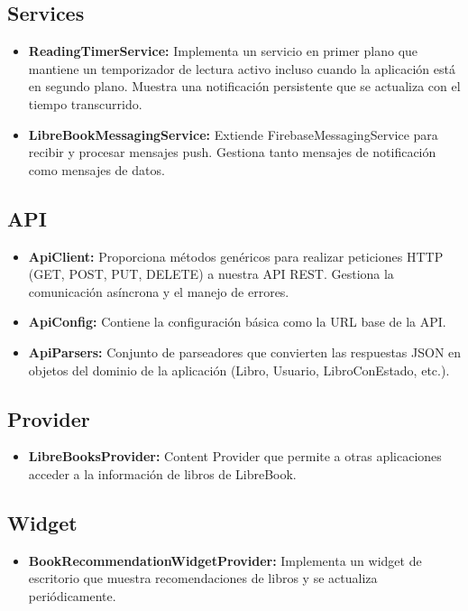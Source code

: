 \documentclass[a4paper,11pt]{report}
\begin{document}
      \subsection{Services}
        \begin{itemize}
          \item \textbf{ReadingTimerService:} Implementa un servicio en primer plano que mantiene un temporizador de lectura activo incluso cuando la aplicación está en segundo plano. Muestra una notificación persistente que se actualiza con el tiempo transcurrido.
          \item \textbf{LibreBookMessagingService:} Extiende FirebaseMessagingService para recibir y procesar mensajes push. Gestiona tanto mensajes de notificación como mensajes de datos.
        \end{itemize}
      \subsection{API}
        \begin{itemize}
          \item \textbf{ApiClient:} Proporciona métodos genéricos para realizar peticiones HTTP (GET, POST, PUT, DELETE) a nuestra API REST. Gestiona la comunicación asíncrona y el manejo de errores.
          \item \textbf{ApiConfig:} Contiene la configuración básica como la URL base de la API.
          \item \textbf{ApiParsers:} Conjunto de parseadores que convierten las respuestas JSON en objetos del dominio de la aplicación (Libro, Usuario, LibroConEstado, etc.).
        \end{itemize}
      \subsection{Provider}
        \begin{itemize}
          \item \textbf{LibreBooksProvider:} Content Provider que permite a otras aplicaciones acceder a la información de libros de LibreBook.
        \end{itemize}
      \subsection{Widget}
        \begin{itemize}
          \item \textbf{BookRecommendationWidgetProvider:} Implementa un widget de escritorio que muestra recomendaciones de libros y se actualiza periódicamente.
        \end{itemize}
\end{document}
